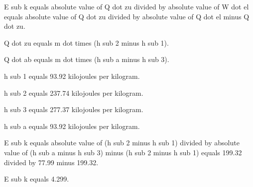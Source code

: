 E sub k equals absolute value of Q dot zu divided by absolute value of W dot el equals absolute value of Q dot zu divided by absolute value of Q dot el minus Q dot zu. 

Q dot zu equals m dot times (h sub 2 minus h sub 1). 

Q dot ab equals m dot times (h sub a minus h sub 3).

h sub 1 equals 93.92 kilojoules per kilogram. 

h sub 2 equals 237.74 kilojoules per kilogram. 

h sub 3 equals 277.37 kilojoules per kilogram. 

h sub a equals 93.92 kilojoules per kilogram.

E sub k equals absolute value of (h sub 2 minus h sub 1) divided by absolute value of (h sub a minus h sub 3) minus (h sub 2 minus h sub 1) equals 199.32 divided by 77.99 minus 199.32.

E sub k equals 4.299.